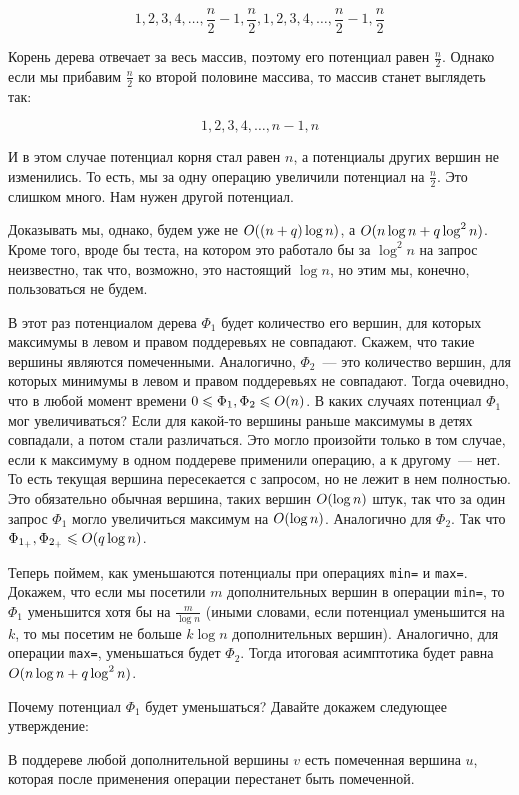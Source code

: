 $$1, 2, 3, 4, \ldots, \frac{n}{2} - 1, \frac{n}{2}, 1, 2, 3, 4, \ldots, \frac{n}{2} - 1, \frac{n}{2}$$

Корень дерева отвечает за весь массив, поэтому его потенциал равен $\frac{n}{2}$. Однако если мы прибавим $\frac{n}{2}$ ко второй половине массива, то массив станет выглядеть так:

$$1, 2, 3, 4, \ldots, n - 1, n$$

И в этом случае потенциал корня стал равен $n$, а потенциалы других вершин не изменились. То есть, мы за одну операцию увеличили потенциал на $\frac{n}{2}$. Это слишком много. Нам нужен другой потенциал.

Доказывать мы, однако, будем уже не $O((n + q) \log n)$, а $O(n \log n + q \log^2 n)$. Кроме того, вроде бы теста, на котором это работало бы за $\log^2 n$ на запрос неизвестно, так что, возможно, это настоящий $\log n$, но этим мы, конечно, пользоваться не будем.

В этот раз потенциалом дерева $\Phi_1$ будет количество его вершин, для которых максимумы в левом и правом поддеревьях не совпадают. Скажем, что такие вершины являются помеченными. Аналогично, $\Phi_2$~--- это количество вершин, для которых минимумы в левом и правом поддеревьях не совпадают.
Тогда очевидно, что в любой момент времени $0 \leqslant \Phi_1, \Phi_2 \leqslant O(n)$. В каких случаях потенциал $\Phi_1$ мог увеличиваться? Если для какой-то вершины раньше максимумы в детях совпадали, а потом стали различаться. Это могло произойти только в том случае, если к максимуму в одном поддереве применили операцию, а к другому~--- нет. То есть текущая вершина пересекается с запросом, но не лежит в нем полностью. Это обязательно обычная вершина, таких вершин $O(\log n)$ штук, так что за один запрос $\Phi_1$ могло увеличиться максимум на $O(\log n)$. Аналогично для $\Phi_2$.
Так что $\Phi_{1_+}, \Phi_{2_+} \leqslant O(q \log n)$.

Теперь поймем, как уменьшаются потенциалы при операциях \verb+min=+ и \verb+max=+. Докажем, что если мы посетили $m$ дополнительных вершин в операции \verb+min=+, то $\Phi_1$ уменьшится хотя бы на $\frac{m}{\log n}$ (иными словами, если потенциал уменьшится на $k$, то мы посетим не больше $k \log n$ дополнительных вершин). Аналогично, для операции \verb+max=+, уменьшаться будет $\Phi_2$. Тогда итоговая асимптотика будет равна $O(n \log n + q \log^2 n)$.

Почему потенциал $\Phi_1$ будет уменьшаться? Давайте докажем следующее утверждение:

\begin{theorem}
    В поддереве любой дополнительной вершины $v$ есть помеченная вершина $u$, которая после применения операции перестанет быть помеченной.
\end{theorem}

